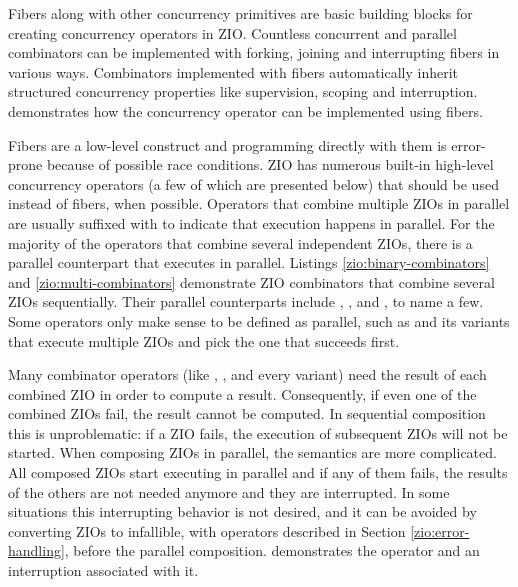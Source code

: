 Fibers along with other concurrency primitives are basic building blocks for creating concurrency operators in ZIO. Countless concurrent and parallel combinators can be implemented with forking, joining and interrupting fibers in various ways. Combinators implemented with fibers automatically inherit structured concurrency properties like supervision, scoping and interruption.  demonstrates how the  concurrency operator can be implemented using fibers.



Fibers are a low-level construct and programming directly with them is error-prone because of possible race conditions. ZIO has numerous built-in high-level concurrency operators (a few of which are presented below) that should be used instead of fibers, when possible. Operators that combine multiple ZIOs in parallel are usually suffixed with  to indicate that execution happens in parallel. For the majority of the operators that combine several independent ZIOs, there is a parallel counterpart that executes in parallel. Listings \ref{zio:binary-combinators} and \ref{zio:multi-combinators} demonstrate ZIO combinators that combine several ZIOs sequentially. Their parallel counterparts include , , and , to name a few. Some operators only make sense to be defined as parallel, such as  and its variants that execute multiple ZIOs and pick the one that succeeds first.

Many combinator operators (like , , and every  variant) need the result of each combined ZIO in order to compute a result. Consequently, if even one of the combined ZIOs fail, the result cannot be computed. In sequential composition this is unproblematic: if a ZIO fails, the execution of subsequent ZIOs will not be started. When composing ZIOs in parallel, the semantics are more complicated. All composed ZIOs start executing in parallel and if any of them fails, the results of the others are not needed anymore and they are interrupted. In some situations this interrupting behavior is not desired, and it can be avoided by converting ZIOs to infallible, with operators described in Section \ref{zio:error-handling}, before the parallel composition.  demonstrates the  operator and an interruption associated with it.

